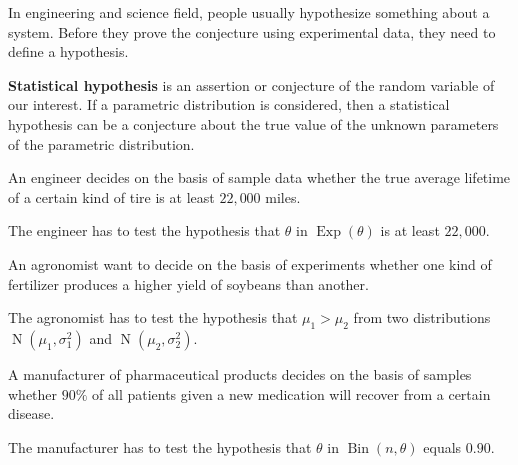 \documentclass{huhtakm-template-book-v2}
\DeclareMathOperator{\Bin}{Bin}
\DeclareMathOperator{\Exp}{Exp}
\DeclareMathOperator{\N}{N}
\begin{document}
In engineering and science field, people usually hypothesize something about a system. Before they prove the conjecture using experimental data, they need to define a hypothesis.
\begin{defn}
	\textbf{Statistical hypothesis} is an assertion or conjecture of the random variable of our interest. If a parametric distribution is considered, then a statistical hypothesis can be a conjecture about the true value of the unknown parameters of the parametric distribution.
\end{defn}
\begin{eg}
	\label{Chapter 4 (Example) Engineer example}
	An engineer decides on the basis of sample data whether the true average lifetime of a certain kind of tire is at least $22,000$ miles.
	
	The engineer has to test the hypothesis that $\theta$ in $\Exp(\theta)$ is at least $22,000$.
\end{eg}
\begin{eg}
	An agronomist want to decide on the basis of experiments whether one kind of fertilizer produces a higher yield of soybeans than another.
	
	The agronomist has to test the hypothesis that $\mu_{1}>\mu_{2}$ from two distributions $\N(\mu_{1},\sigma_{1}^{2})$ and $\N(\mu_{2},\sigma_{2}^{2})$.
\end{eg}
\begin{eg}
	\label{Chapter 4 (Example) Manufacturer example}
	A manufacturer of pharmaceutical products decides on the basis of samples whether $90\%$ of all patients given a new medication will recover from a certain disease.
	
	The manufacturer has to test the hypothesis that $\theta$ in $\Bin(n,\theta)$ equals $0.90$.
\end{eg}
\end{document}
